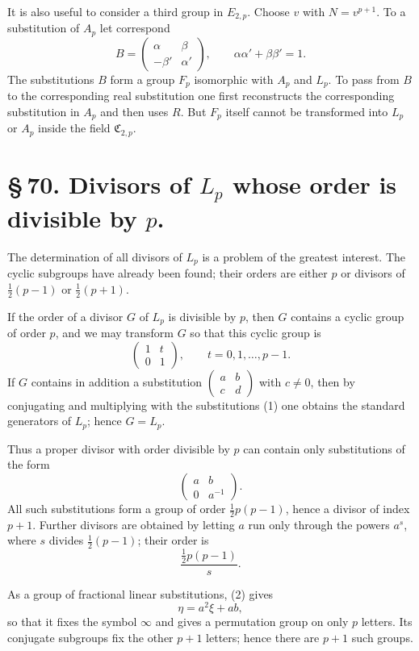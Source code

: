 \documentclass[11pt]{article}
\providecommand{\mat}[4]{\begin{pmatrix}#1&#2\\#3&#4\end{pmatrix}}
\providecommand{\mat}[4]{\begin{pmatrix}#1&#2\\#3&#4\end{pmatrix}}
\providecommand{\Cfield}{\mathfrak C}
\providecommand{\mat}[1]{\begin{pmatrix}#1\end{pmatrix}}
\begin{document}
It is also useful to consider a third group in $E_{2,p}$. Choose $v$ with $N=v^{p+1}$. To a substitution of $A_p$ let correspond
\begin{equation}
 B=\mat{\alpha}{\beta}{-\beta'}{\alpha'},
 \qquad \alpha\alpha'+\beta\beta'=1.
 \tag{7}
\end{equation}
The substitutions $B$ form a group $F_p$ isomorphic with $A_p$ and $L_p$. To pass from $B$ to the corresponding real substitution one first reconstructs the corresponding substitution in $A_p$ and then uses $R$. But $F_p$ itself cannot be transformed into $L_p$ or $A_p$ inside the field $\Cfield_{2,p}$.

\section*{\S\,70. Divisors of $L_p$ whose order is divisible by $p$.}

The determination of all divisors of $L_p$ is a problem of the greatest interest. The cyclic subgroups have already been found; their orders are either $p$ or divisors of $\frac12(p-1)$ or $\frac12(p+1)$.

If the order of a divisor $G$ of $L_p$ is divisible by $p$, then $G$ contains a cyclic group of order $p$, and we may transform $G$ so that this cyclic group is
\begin{equation}
 \mat{1}{t}{0}{1},
 \qquad t=0,1,\ldots,p-1.
 \tag{1}
\end{equation}
If $G$ contains in addition a substitution $\mat{a}{b}{c}{d}$ with $c\ne0$, then by conjugating and multiplying with the substitutions (1) one obtains the standard generators of $L_p$; hence $G=L_p$.

Thus a proper divisor with order divisible by $p$ can contain only substitutions of the form
\begin{equation}
 \mat{a}{b}{0}{a^{-1}}.
 \tag{2}
\end{equation}
All such substitutions form a group of order $\frac12p(p-1)$, hence a divisor of index $p+1$. Further divisors are obtained by letting $a$ run only through the powers $a^s$, where $s$ divides $\frac12(p-1)$; their order is
\begin{equation}
 \frac{\frac12p(p-1)}{s}.
 \tag{3}
\end{equation}

As a group of fractional linear substitutions, (2) gives
\[
 \eta=a^2\xi+ab,
\]
so that it fixes the symbol $\infty$ and gives a permutation group on only $p$ letters. Its conjugate subgroups fix the other $p+1$ letters; hence there are $p+1$ such groups.
\end{document}
